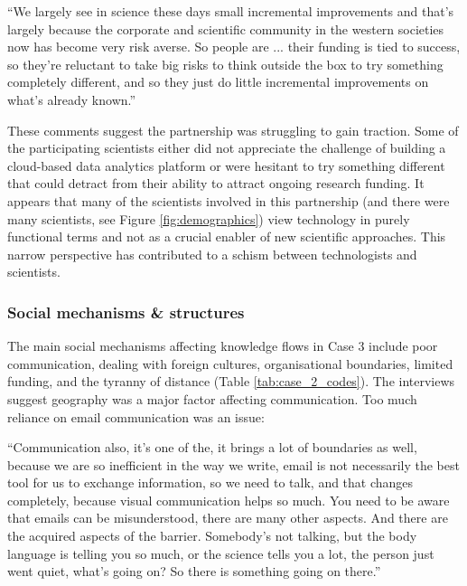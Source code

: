 \begin{displayquote}[Participant 16/3]
\small
\enquote{We largely see in science these days small incremental improvements and that's largely because the corporate and scientific community in the western societies now has become very risk averse. So people are ... their funding is tied to success, so they're reluctant to take big risks to think outside the box to try something completely different, and so they just do little incremental improvements on what's already known.} 
\end{displayquote}

These comments suggest the partnership was struggling to gain traction. Some of the participating scientists either did not appreciate the challenge of building a cloud-based data analytics platform or were hesitant to try something different that could detract from their ability to attract ongoing research funding. It appears that many of the scientists involved in this partnership (and there were many scientists, see Figure \ref{fig:demographics}) view technology in purely functional terms and not as a crucial enabler of new scientific approaches. This narrow perspective has contributed to a schism between technologists and scientists.

\subsubsection{Social mechanisms \& structures}

The main social mechanisms affecting knowledge flows in Case 3 include poor communication, dealing with foreign cultures, organisational boundaries, limited funding, and the tyranny of distance (Table \ref{tab:case_2_codes}). The interviews suggest geography was a major factor affecting communication. Too much reliance on email communication was an issue:

\begin{displayquote}[Participant 10/3]
\small
\enquote{Communication also, it's one of the, it brings a lot of boundaries as well, because we are so inefficient in the way we write, email is not necessarily the best tool for us to exchange information, so we need to talk, and that changes completely, because visual communication helps so much. You need to be aware that emails can be misunderstood, there are many other aspects. And there are the acquired aspects of the barrier. Somebody's not talking, but the body language is telling you so much, or the science tells you a lot, the person just went quiet, what's going on? So there is something going on there.} 
\end{displayquote}

